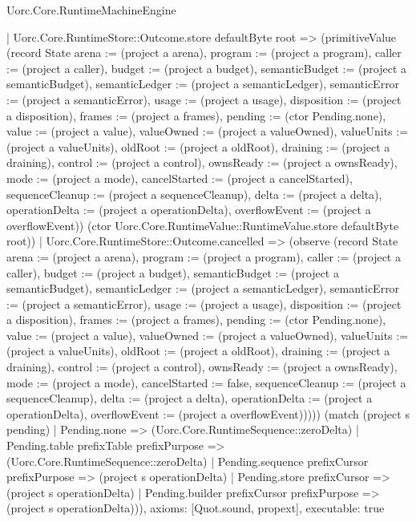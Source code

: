 \begin{lexlean}{Uorc.Core.RuntimeMachineEngine}
\begin{semanticmodule}
{    | Uorc.Core.RuntimeStore::Outcome.store defaultByte root => (primitiveValue (record State {arena := (project a arena), program := (project a program), caller := (project a caller), budget := (project a budget), semanticBudget := (project a semanticBudget), semanticLedger := (project a semanticLedger), semanticError := (project a semanticError), usage := (project a usage), disposition := (project a disposition), frames := (project a frames), pending := (ctor Pending.none), value := (project a value), valueOwned := (project a valueOwned), valueUnits := (project a valueUnits), oldRoot := (project a oldRoot), draining := (project a draining), control := (project a control), ownsReady := (project a ownsReady), mode := (project a mode), cancelStarted := (project a cancelStarted), sequenceCleanup := (project a sequenceCleanup), delta := (project a delta), operationDelta := (project a operationDelta), overflowEvent := (project a overflowEvent)}) (ctor Uorc.Core.RuntimeValue::RuntimeValue.store defaultByte root))
    | Uorc.Core.RuntimeStore::Outcome.cancelled => (observe (record State {arena := (project a arena), program := (project a program), caller := (project a caller), budget := (project a budget), semanticBudget := (project a semanticBudget), semanticLedger := (project a semanticLedger), semanticError := (project a semanticError), usage := (project a usage), disposition := (project a disposition), frames := (project a frames), pending := (ctor Pending.none), value := (project a value), valueOwned := (project a valueOwned), valueUnits := (project a valueUnits), oldRoot := (project a oldRoot), draining := (project a draining), control := (project a control), ownsReady := (project a ownsReady), mode := (project a mode), cancelStarted := false, sequenceCleanup := (project a sequenceCleanup), delta := (project a delta), operationDelta := (project a operationDelta), overflowEvent := (project a overflowEvent)})))) (match (project s pending)
    | Pending.none => (Uorc.Core.RuntimeSequence::zeroDelta)
    | Pending.table prefixTable prefixPurpose => (Uorc.Core.RuntimeSequence::zeroDelta)
    | Pending.sequence prefixCursor prefixPurpose => (project s operationDelta)
    | Pending.store prefixCursor => (project s operationDelta)
    | Pending.builder prefixCursor prefixPurpose => (project s operationDelta))),
  axioms: [Quot.sound, propext],
  executable: true
}


\end{semanticmodule}
\end{lexlean}
